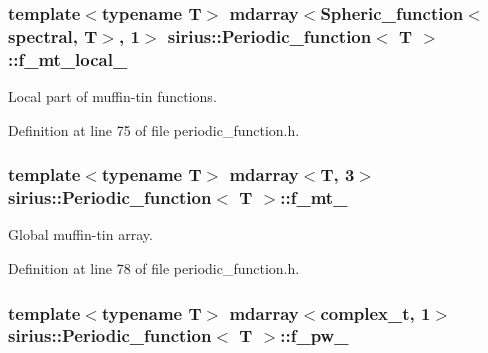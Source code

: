 \subsubsection[{f\+\_\+mt\+\_\+local\+\_\+}]{\setlength{\rightskip}{0pt plus 5cm}template$<$typename T$>$ {\bf mdarray}$<${\bf Spheric\+\_\+function}$<$spectral, T$>$, 1$>$ {\bf sirius\+::\+Periodic\+\_\+function}$<$ T $>$\+::f\+\_\+mt\+\_\+local\+\_\+\hspace{0.3cm}{\ttfamily [private]}}\label{classsirius_1_1_periodic__function_afcea2d8d52eadb829c6208e6701b9c11}


Local part of muffin-\/tin functions. 



Definition at line 75 of file periodic\+\_\+function.\+h.

\hypertarget{classsirius_1_1_periodic__function_ad94fec4be54aabdb4d803d2864c71da3}{}
\subsubsection[{f\+\_\+mt\+\_\+}]{\setlength{\rightskip}{0pt plus 5cm}template$<$typename T$>$ {\bf mdarray}$<$T, 3$>$ {\bf sirius\+::\+Periodic\+\_\+function}$<$ T $>$\+::f\+\_\+mt\+\_\+\hspace{0.3cm}{\ttfamily [private]}}\label{classsirius_1_1_periodic__function_ad94fec4be54aabdb4d803d2864c71da3}


Global muffin-\/tin array. 



Definition at line 78 of file periodic\+\_\+function.\+h.

\hypertarget{classsirius_1_1_periodic__function_a3ba5873e5d97bf83597353435218da22}{}
\subsubsection[{f\+\_\+pw\+\_\+}]{\setlength{\rightskip}{0pt plus 5cm}template$<$typename T$>$ {\bf mdarray}$<${\bf complex\+\_\+t}, 1$>$ {\bf sirius\+::\+Periodic\+\_\+function}$<$ T $>$\+::f\+\_\+pw\+\_\+\hspace{0.3cm}{\ttfamily [private]}}\label{classsirius_1_1_periodic__function_a3ba5873e5d97bf83597353435218da22}


